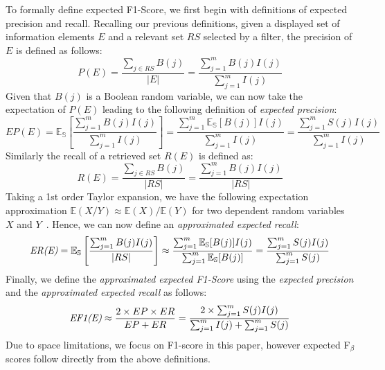 To formally define expected F1-Score, we first begin with definitions of expected precision and recall.  Recalling our previous definitions, given a displayed set of information elements $E$ and a relevant set $RS$ selected by a filter, %
the precision of $E$ is defined as follows:
\begin{equation}
   P(E) = \dfrac{\sum_{j \in RS} B(j)}{|E|} = \dfrac{\sum_{j=1}^m B(j)I(j)}{\sum_{j=1}^m I(j)} 
\end{equation}
Given that $B(j)$ is a Boolean random variable, we can now take the expectation of $P(E)$ leading to the following definition of 
\emph{expected precision}: 
\begin{equation}
EP(E)=\mathbb{E_{S}} \left[ \dfrac{\sum_{j=1}^{m}B(j)I(j)}{\sum_{j=1}^{m}I(j)} \right]=\dfrac{\sum_{j=1}^{m}\mathbb{E_{S}}[B(j)]I(j)}{\sum_{j=1}^{m}I(j)}=\dfrac{\sum_{j=1}^{m}S(j)I(j)}{\sum_{j=1}^{m}I(j)}
\end{equation}
Similarly the recall of a retrieved set $R(E)$ is defined as:
\begin{equation}
   R(E) = \dfrac{\sum_{j \in RS} B(j)}{|RS|} = \dfrac{\sum_{j=1}^m B(j)I(j)}{|RS|} 
\end{equation}
Taking a 1st order Taylor expansion, we have the following expectation approximation %
$\mathbb{E}(X/Y)\approx \mathbb{E}(X)/ \mathbb{E}(Y)$ for two dependent random variables $X$ and $Y$~\cite{Kempen2000}. Hence, 
we can now define an \emph{approximated expected recall}: 
\begin{equation}
   	\emph{ER(E)}=\mathbb{E_{S}} \left[ \dfrac{\sum_{j=1}^{m}B(j)I(j)}{|RS|} \right] \approx \dfrac{\sum_{j=1}^{m}\mathbb{E_{S}}[B(j)]I(j)}{\sum_{j=1}^m \mathbb{E_{S}}[B(j)]} = \dfrac{\sum_{j=1}^m S(j)I(j)}{\sum_{j=1}^m S(j)} 
\end{equation}
Finally, we define the \emph{approximated expected F1-Score} using the \emph{expected precision} and the \emph{approximated expected recall} as follows: 
\begin{align}
    \emph{EF1(E)}  \approx \dfrac{2\times EP\times ER}{EP+ER} = \dfrac{2\times\sum_{j=1}^m S(j)I(j)}{\sum_{j=1}^m I(j) + \sum_{j=1}^m S(j)}
\end{align}
Due to space limitations, we focus on F1-score in this paper, however expected F$_\beta$ scores follow directly from the above definitions.
  
